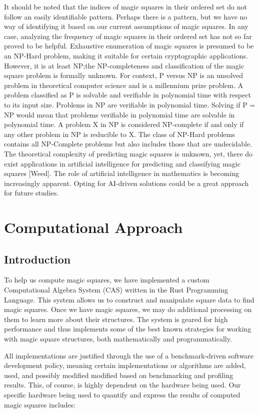 \documentclass{rhumj_new}
\begin{document}
It should be noted that the indices of magic squares in their ordered set do not follow an
easily identifiable pattern. Perhaps there is a pattern, but we have no way of identifying it based
on our current assumptions of magic squares. In any case, analyzing the frequency of magic squares
in their ordered set has not so far proved to be helpful. Exhaustive enumeration of magic squares
is presumed to be an NP-Hard problem, making it suitable for certain cryptographic applications.
However, it is at least NP;\@ the NP-completeness and classification of the magic square problem is
formally unknown. For context, P versus NP is an unsolved problem in theoretical computer science
and is a millennium prize problem. A problem classified as P is solvable and verifiable in
polynomial time with respect to its input size. Problems in NP are verifiable in polynomial time.
Solving if P = NP would mean that problems verifiable in polynomial time are solvable in polynomial
time. A problem X in NP is considered NP-complete if and only if any other problem in NP is
reducible to X. The class of NP-Hard problems contains all NP-Complete problems but also includes
those that are undecidable. The theoretical complexity of predicting magic squares is unknown, yet,
there do exist applications in artificial intelligence for predicting and classifying magic squares
  [Weed]. The role of artificial intelligence in mathematics is becoming increasingly apparent.
Opting for AI-driven solutions could be a great approach for future studies.

\section{Computational Approach}

\subsection{Introduction}

To help us compute magic squares, we have implemented a custom Computational Algebra System
(CAS) written in the Rust Programming Language. This system allows us to construct and manipulate
square data to find magic squares. Once we have magic squares, we may do additional processing on
them to learn more about their structures. The system is geared for high performance and thus
implements some of the best known strategies for working with magic square structures, both
mathematically and programmatically.

All implementations are justified through the use of a benchmark-driven software development
policy, meaning certain implementations or algorithms are added, used, and possibly modified
modified based on benchmarking and profiling results. This, of course, is highly dependent on the
hardware being used. Our specific hardware being used to quantify and express the results of
computed magic squares includes:
\end{document}
